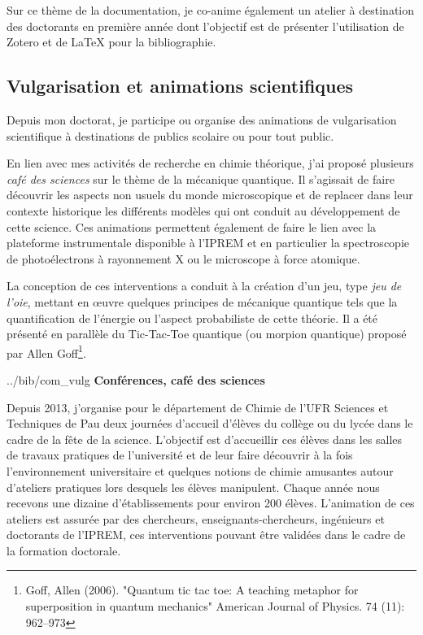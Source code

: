 \documentclass[11pt]{artuppax}
\newcounter{subsec}[section]
\begin{document}
Sur ce thème de la documentation, je co-anime également un atelier à destination des
doctorants en première année dont l'objectif est de présenter l'utilisation de Zotero
et de \LaTeX{} pour la bibliographie.

\subsection{Vulgarisation et animations scientifiques}

Depuis mon doctorat, je participe ou organise des animations de vulgarisation
scientifique à destinations de publics scolaire ou pour tout public.

En lien avec mes activités de recherche en chimie théorique, j'ai proposé plusieurs
\textit{café des sciences} sur le thème de la mécanique quantique. Il s'agissait de faire
découvrir les aspects non usuels du monde microscopique et de replacer dans
leur contexte historique les différents modèles qui ont conduit au développement
de cette science. Ces animations permettent également de faire le lien avec la
plateforme instrumentale disponible à l'IPREM et en particulier la spectroscopie
de photoélectrons à rayonnement X ou le microscope à force atomique.

La conception de ces interventions a conduit à la création d'un jeu, type
\textit{jeu de l'oie}, mettant en œuvre quelques principes de mécanique quantique
tels que la quantification de l'énergie ou l'aspect probabiliste de cette théorie.
Il a été présenté en parallèle du Tic-Tac-Toe quantique (ou morpion quantique) proposé par
Allen Goff\footnote{Goff, Allen (2006). "Quantum tic tac toe: A teaching metaphor for superposition in quantum mechanics" American Journal of Physics. 74 (11): 962–973}.

\begin{btSect}{../bib/com_vulg}
    \singlespacing
    \setlength{\bibsep}{2pt plus 0.3ex}
    \textbf{Conférences, café des sciences}
    \vspace{-5mm}
    \btPrintAll
\end{btSect}

Depuis 2013, j'organise pour le département de Chimie de l'UFR Sciences et Techniques
de Pau deux journées d'accueil d'élèves du collège ou du lycée dans le cadre de la
fête de la science. L'objectif est d'accueillir ces élèves dans les salles de travaux
pratiques de l'université et de leur faire découvrir à la fois l'environnement
universitaire et quelques notions de chimie amusantes autour d'ateliers pratiques
lors desquels  les élèves manipulent. Chaque année nous recevons
une dizaine d'établissements pour environ 200 élèves. L'animation de ces ateliers
est assurée par des chercheurs, enseignants-chercheurs, ingénieurs et doctorants
de l'IPREM, ces interventions pouvant être validées dans le cadre de la formation
doctorale.
\end{document}
